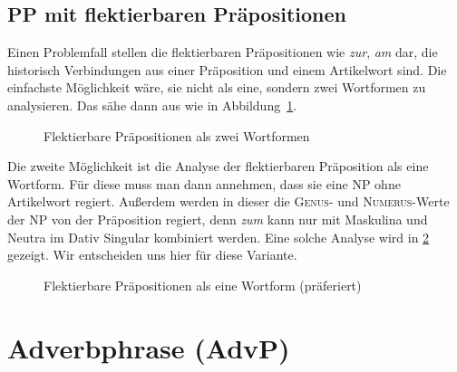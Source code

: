 \subsection{PP mit flektierbaren Präpositionen}

\label{sec:syntaxflektierbareprp}


Einen Problemfall stellen die flektierbaren Präpositionen wie \textit{zur}, \textit{am} dar, die historisch Verbindungen aus einer Präposition und einem Artikelwort sind.
Die einfachste Möglichkeit wäre, sie nicht als eine, sondern zwei Wortformen zu analysieren.
Das sähe dann aus wie in Abbildung~\ref{fig:flektprpreanalyse}.

\begin{figure}
  \centering
  \caption{Flektierbare Präpositionen als zwei Wortformen}
  \label{fig:flektprpreanalyse}
\end{figure}

Die zweite Möglichkeit ist die Analyse der flektierbaren Präposition als eine Wortform.
Für diese muss man dann annehmen, dass sie eine NP ohne Artikelwort regiert.
Außerdem werden in dieser die \textsc{Genus}- und \textsc{Numerus}-Werte der NP von der Präposition regiert, denn \textit{zum} kann \zB nur mit Maskulina und Neutra im Dativ Singular kombiniert werden.
Eine solche Analyse wird in \ref{fig:flektprpalswortform} gezeigt.
Wir entscheiden uns hier für diese Variante.

\begin{figure}
  \centering
  \caption{Flektierbare Präpositionen als eine Wortform (präferiert)}
  \label{fig:flektprpalswortform}
\end{figure}

\section{Adverbphrase (AdvP)}

